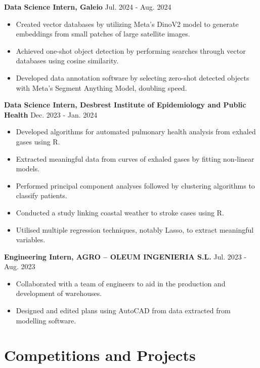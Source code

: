 \documentclass[a4paper,10pt]{article}
\begin{document}
\medskip

\noindent
\textbf{Data Science Intern, Galeio} \hfill Jul. 2024 - Aug. 2024
\begin{itemize}[noitemsep, topsep=0pt, parsep=0pt, partopsep=0pt]
    \item Created vector databases by utilizing Meta's DinoV2 model to generate embeddings from small patches of large satellite images.
    \item Achieved one-shot object detection by performing searches through vector databases using cosine similarity.
    \item Developed data annotation software by selecting zero-shot detected objects with Meta's Segment Anything Model, doubling speed.
\end{itemize}

\medskip

\noindent
\textbf{Data Science Intern, Desbrest Institute of Epidemiology and Public Health} \hfill Dec. 2023 - Jan. 2024
\begin{itemize}[noitemsep, topsep=0pt, parsep=0pt, partopsep=0pt]
    \item Developed algorithms for automated pulmonary health analysis from exhaled gases using R.
    \item Extracted meaningful data from curves of exhaled gases by fitting non-linear models.
    \item Performed principal component analyses followed by clustering algorithms to classify patients.
    \item Conducted a study linking coastal weather to stroke cases using R.
    \item Utilised multiple regression techniques, notably Lasso, to extract meaningful variables.
\end{itemize}

\medskip

\noindent
\textbf{Engineering Intern, AGRO – OLEUM INGENIERIA S.L.} \hfill Jul. 2023 - Aug. 2023
\begin{itemize}[noitemsep, topsep=0pt, parsep=0pt, partopsep=0pt]
    \item Collaborated with a team of engineers to aid in the production and development of warehouses.
    \item Designed and edited plans using AutoCAD from data extracted from modelling software.
\end{itemize}

\section*{Competitions and Projects}
\end{document}
